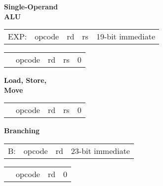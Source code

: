 \documentclass{article}
\begin{document}
\bigskip\bigskip

\begin{minipage}[t]{0.3\textwidth}
	\begin{center}
		\textbf{Single-Operand\\ ALU}
	\end{center}
\end{minipage}
\begin{minipage}[t]{110mm}	
	\begin{tabular}{p{12mm}|C{15mm}|C{10mm}|C{10mm}|C{55.3mm}|}
			EXP: & opcode & rd & rs & 19-bit immediate \\
	\end{tabular}

	\medskip

	\begin{tabular}{p{12mm}|C{15mm}|C{10mm}|C{10mm}|C{55.3mm}|}
		 & opcode & rd & rs & 0 \\
	\end{tabular}
\end{minipage}

\bigskip\bigskip\bigskip

\begin{minipage}[t]{0.3\textwidth}
	\begin{center}
		\textbf{Load, Store, \\ Move}
	\end{center}
\end{minipage}
\begin{minipage}[t]{110mm}

	\begin{tabular}{p{12mm}|C{15mm}|C{10mm}|C{10mm}|C{55.15mm}|}
		 & opcode & rd & rs & 0 \\
	\end{tabular}

	\end{minipage}

\bigskip\bigskip\bigskip

\begin{minipage}[t]{0.3\textwidth}
	\begin{center}
		\textbf{Branching}
	\end{center}
\end{minipage}
\begin{minipage}[t]{110mm}
	\begin{tabular}{p{12mm}|C{15mm}|C{10mm}|C{65.3mm}|}
		\quad B: & opcode & rd & 23-bit immediate \\
	\end{tabular}

	\medskip

	\begin{tabular}{p{12mm}|C{15mm}|C{10mm}|C{65.3mm}|}
		 & opcode & rd & 0 \\
	\end{tabular}

\end{minipage}
\end{document}
